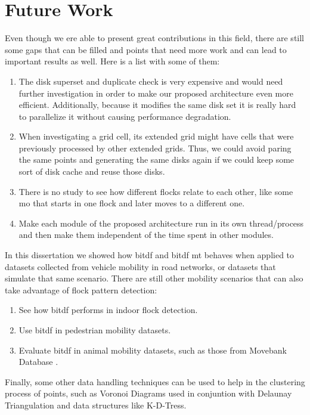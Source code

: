 \section{Future Work}
Even though we ere able to present great contributions in this field, there are still some gaps that can be filled and
points that need more work and can lead to important results as well. Here is a list with some of them:

\begin{enumerate}
    \item The disk superset and duplicate check is very expensive and would need further investigation in order to make
        our proposed architecture even more efficient. Additionally, because it modifies the same disk set it is really
        hard to parallelize it without causing performance degradation.
    \item When investigating a grid cell, its extended grid might have cells that were previously processed by other
        extended grids. Thus, we could avoid paring the same points and generating the same disks again if we could keep
        some sort of disk cache and reuse those disks.
    \item There is no study to see how different flocks relate to each other, like some \ac{mo} that starts in one flock
        and later moves to a different one.
    \item Make each module of the proposed architecture run in its own thread/process and then make them independent of
        the time spent in other modules.
\end{enumerate}

In this dissertation we showed how \ac{bitdf} and \ac{bitdf} \ac{mt} behaves when applied to datasets collected from
vehicle mobility in road networks, or datasets that simulate that same scenario. There are still other mobility
scenarios that can also take advantage of flock pattern detection:

\begin{enumerate}
    \item See how \ac{bitdf} performs in indoor flock detection.
    \item Use \ac{bitdf} in pedestrian mobility datasets.
    \item Evaluate \ac{bitdf} in animal mobility datasets, such as those from Movebank Database \citep{movebank}.
\end{enumerate}

Finally, some other data handling techniques can be used to help in the clustering process of points, such as Voronoi
Diagrams used in conjuntion with Delaunay Triangulation and data structures like K-D-Tress.

